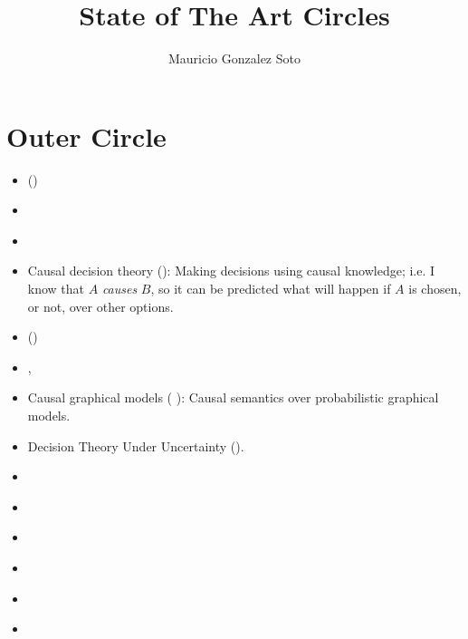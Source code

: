 \documentclass[11pt]{article}
\title{State of The Art Circles}
\author{Mauricio Gonzalez Soto}
\theoremstyle{plain}
\begin{document}
\maketitle
\section{Outer Circle}
\begin{itemize}
\item (\cite{suppes1970probabilistic})
\item \cite{holland1986statistics}
\item \cite{sutton1998reinforcement}
\item Causal decision theory (\cite{joyce1999foundations}): Making decisions using causal knowledge; i.e. I know that $A$ \textit{causes} $B$, so it can be predicted what will happen if $A$ is chosen, or not, over other options. 
\item (\cite{spirtes2000causation})
\item \cite{pearl2009causality},
\item Causal graphical models ( \cite{koller2009probabilistic}): Causal semantics over probabilistic graphical models.
\item Decision Theory Under Uncertainty (\cite{gilboa2009decision}).
\item \cite{pearl1988probabilistic}
\item \cite{van2012reinforcement}
\item  \cite{danks2014unifying}
\item \cite{gershman2015reinforcement}
\item \cite{lopez2015towards}
\item \cite{lake2017building}
\end{itemize}
\end{document}
